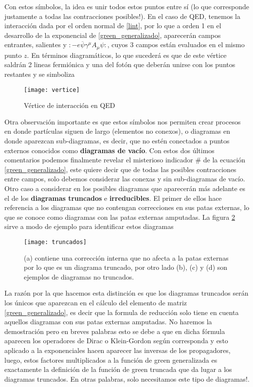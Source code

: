 \documentclass[tickz]{article}
\numberwithin{equation}{section}
\begin{document}
Con estos símbolos, la idea es unir todos estos puntos
entre sí (lo que corresponde justamente a todas las contracciones
posibles!). En el caso de QED, tenemos la interacción dada por el orden normal de \ref{lint},
por lo que a orden 1 en el desarrollo de la exponencial de \ref{green_generalizado}, aparecerán campos entrantes, salientes y  $:-e\overline{\psi}\gamma^{\mu}A_{\mu}\psi :$, cuyos 3 campos están evaluados en el mismo punto $ z $. En términos
diagramáticos, lo que sucederá es que de este vértice saldrán 2 lineas
fermiónica y una del fotón que deberán unirse con los puntos restantes y se simboliza

\begin{figure}[h]
\centering
\texttt{[image: vertice]}
\caption{Vértice de interacción en QED}
\label{fig_vertex}
\end{figure}



Otra observación importante es que estos símbolos nos permiten
crear procesos en donde partículas siguen de largo (elementos no conexos),
o diagramas en donde aparezcan sub-diagramas, es decir, que no estén conectados
a puntos externos conocidos como \textbf{diagramas de vacío}. Con
estos dos últimos comentarios podemos finalmente revelar el misterioso
indicador $\#$ de la ecuación \ref{green_generalizado}, este quiere decir que de todas
las posibles contracciones entre campos, solo debemos considerar las
conexas y sin sub-diagramas de vacío. Otro caso a considerar en los posibles diagramas que aparecerán más adelante es el de los \textbf{diagramas truncados} e \textbf{irreducibles}. El primer de ellos hace referencia a los diagramas que no contengan correcciones en sus patas externas, lo que se conoce como diagramas con las patas externas amputadas. La figura \ref{fig_truncados} sirve a modo de ejemplo para identificar estos diagramas

\begin{figure}[h]
	\centering
	\texttt{[image: truncados]}
	\caption{(a) contiene una corrección interna que no afecta a la patas externas por lo que es un diagrama truncado, por otro lado (b), (c) y (d) son ejemplos de diagramas no truncados.}
	\label{fig_truncados}
\end{figure}


La razón por la que hacemos esta distinción es que los diagramas truncados serán los únicos que aparezcan en el cálculo del elemento de matriz \ref{green_generalizado}, es decir que la formula de reducción solo tiene en cuenta aquellos diagramas con sus patas externas amputadas. No haremos la demostración pero en breves palabras esto se debe a que en dicha fórmula aparecen los operadores de Dirac o Klein-Gordon según corresponda y esto aplicado a la exponenciales hacen aparecer las inversas de los propagadores, luego, estos factores multiplicados a la función de green generalizada es exactamente la definición de la función de green truncada que da lugar a los diagramas truncados. En otras palabras, solo necesitamos este tipo de diagramas!.
\end{document}
